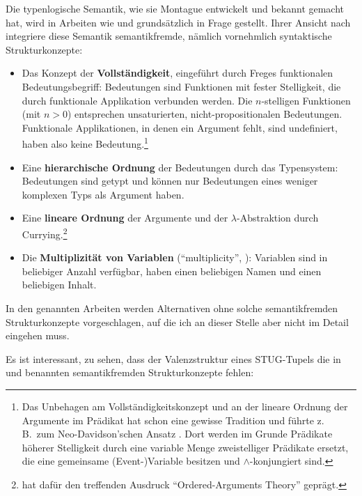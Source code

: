 {Die typenlogische Semantik, wie sie Montague entwickelt und bekannt gemacht hat, wird in Arbeiten wie \cite{Kracht:07,Kracht:11} und \cite{Erdelyi-Szabo:etal:08} grundsätzlich in Frage gestellt. Ihrer Ansicht nach integriere diese Semantik semantikfremde, nämlich vornehmlich syntaktische Strukturkonzepte:

\begin{itemize}
  \item Das Konzept der {\bf Vollständigkeit}, eingeführt durch Freges funktionalen Bedeutungsbegriff: Bedeutungen sind Funktionen mit fester Stelligkeit, die durch funktionale Applikation verbunden werden. Die $n$-stelligen Funktionen (mit $n > 0$) entsprechen unsaturierten, nicht-propositionalen Bedeutungen. Funktionale Applikationen, in denen ein Argument fehlt, sind undefiniert, haben also keine Bedeutung.\footnote{Das Unbehagen am Vollständigkeitskonzept und an der lineare Ordnung der Argumente im Prädikat hat schon eine gewisse Tradition und führte z.\,B.\ zum Neo-Davidson'schen Ansatz \citep{Parsons:90,Parsons:95}. Dort werden im Grunde Prädikate höherer Stelligkeit durch eine variable Menge zweistelliger Prädikate ersetzt, die eine gemeinsame (Event-)Variable besitzen und $\wedge$-konjungiert sind.}
  \item Eine {\bf hierarchische Ordnung} der Bedeutungen durch das Typensystem: Bedeutungen sind getypt und können nur Bedeutungen eines weniger komplexen Typs als Argument haben.  
  \item Eine {\bf lineare Ordnung} der Argumente und der $\lambda$-Abstraktion durch Currying.\footnote{\cite{Dowty:89} hat dafür den treffenden Ausdruck "`Ordered-Arguments Theory"' geprägt.}
  \item Die {\bf Multiplizität von Variablen} ("`multiplicity"', \citealt{Kracht:07,Kracht:11}): Variablen sind in beliebiger Anzahl verfügbar, haben einen beliebigen Namen und einen beliebigen Inhalt.
\end{itemize}
In den genannten Arbeiten werden Alternativen ohne solche semantikfremden Strukturkonzepte vorgeschlagen, auf die ich an dieser Stelle aber nicht im Detail eingehen muss. 


Es ist interessant, zu sehen, dass der Valenzstruktur eines STUG-Tupels die in \cite{Kracht:07,Kracht:11} und \cite{Erdelyi-Szabo:etal:08} benannten semantikfremden Strukturkonzepte fehlen: 

}
